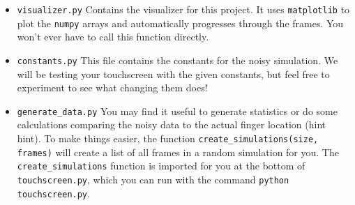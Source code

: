 \documentclass{article}
\begin{document}
\begin{itemize}
    \item \texttt{visualizer.py} Contains the visualizer for this project. It uses \texttt{matplotlib} to plot the \texttt{numpy} arrays and automatically progresses through the frames. You won't ever have to call this function directly.

    \item \texttt{constants.py} This file contains the constants for the noisy simulation. We will be testing your touchscreen with the given constants, but feel free to experiment to see what changing them does!

    \item \texttt{generate\_data.py} You may find it useful to generate statistics or do some calculations comparing the noisy data to the actual finger location (hint hint). To make things easier, the function \texttt{create\_simulations(size, frames)} will create a list of all frames in a random simulation for you. The \texttt{create\_simulations} function is imported for you at the bottom of \texttt{touchscreen.py}, which you can run with the command \texttt{python touchscreen.py}.
\end{itemize}
\end{document}
